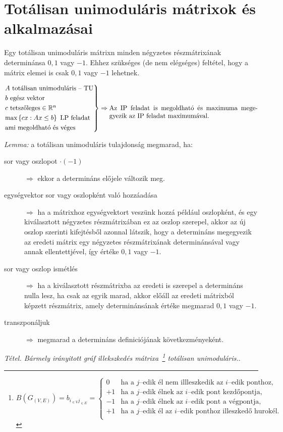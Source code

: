 \newpage
\section{Totálisan unimoduláris mátrixok és alkalmazásai}

Egy totálisan unimoduláris mátrixn minden négyzetes részmátrixának determinánsa
$0, 1$ vagy $-1$. Ehhez szükséges (de nem elégséges) feltétel, hogy a mátrix
elemei is csak $0, 1$ vagy $-1$ lehetnek.

\[
\begin{rcases}
A \text{ totálisan unimoduláris -- TU} \\
b \text{ egész vektor} \\
c \text{ tetszőleges} \in \mathbb{R}^n \\
\text{max} \left\{ cx:Ax \leq b \right\} \text{ LP feladat}\\
\text{ami megoldható és véges}
\end{rcases} \Rightarrow \parbox[t]{8cm}{ Az IP feladat is megoldható és
maximuma megegyezik az IP feladat maximumával.}
\]

\emph{Lemma:} a totálisan unimoduláris tulajdonság megmarad, ha:

\begin{description}
  \item[sor vagy oszlopot $\cdot (-1)$] $\Rightarrow$ ekkor a determináns
  előjele változik meg.
  \item[egységvektor sor vagy oszlopként való hozzáadása] $\Rightarrow$ ha a
  mátrixhoz egységvektort veszünk hozzá például oszlopként, és egy kiválasztott
  négyzetes részmátrixában ez az oszlop szerepel, akkor az új oszlop szerinti
  kifejtésből azonnal látszik, hogy a determináns megegyezik az eredeti mátrix
  egy négyzetes részmátrixának determinánsával vagy annak ellentettjével, így
  értéke $0, 1$ vagy $-1$.
  \item[sor vagy oszlop ismétlés] $\Rightarrow$ ha a kiválasztott részmátrixba
  az eredeti is szerepel a determináns nulla lesz, ha csak az egyik marad, akkor
  előáll az eredeti mátrixból képzett részmátrix, amely determinánsának értéke
  megmarad $0, 1$ vagy $-1$. 
  \item[transzponáljuk] $\Rightarrow$ megmarad a determináns definiciójának
  következményeként.
\end{description}

\emph{Tétel. Bármely irányitott gráf illekszkedés mátrixa~\footnote{$ 
B(G_{(V,E)})=
b_{i_{\in V}j_{\in E}}=
\begin{cases}
0  & \text{ha a } j \text{--edik él nem illleszkedik az } i \text{--edik ponthoz,} \\
+1  & \text{ha a } j \text{--edik élnek az } i \text{--edik pont kezdőpontja,} \\
-1  & \text{ha a } j \text{--edik élnek az } i \text{--edik pont a végpontja,} \\
+1  & \text{ha a } j \text{--edik él az } i \text{--edik ponthoz illeszkedő hurokél.} \\
\end{cases}$} totálisan unimoduláris.}.\\

